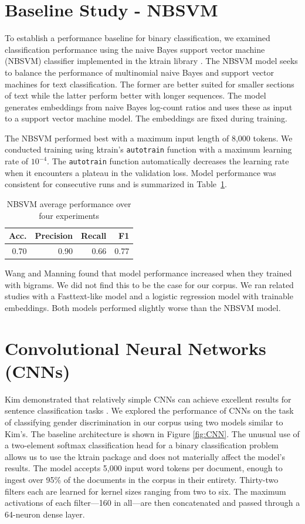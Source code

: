 \documentclass[twocolumn,10pt]{wmrDoc}
\begin{document}
\section{Baseline Study - NBSVM}
To establish a performance baseline for binary classification, we examined classification performance using the naive Bayes support vector machine (NBSVM) classifier implemented in the ktrain library \cite{ktrain}.  The NBSVM model \cite{wang2012} seeks to balance the performance of multinomial naive Bayes and support vector machines for text classification.  The former are better suited for smaller sections of text while the latter perform better with longer sequences.  The model generates embeddings from naive Bayes log-count ratios and uses these as input to a support vector machine model.  The embeddings are fixed during training.

The NBSVM performed best with a maximum input length of 8,000 tokens.  We conducted training using ktrain's \verb|autotrain| function with a maximum learning rate of $10^{-4}$.  The \verb|autotrain| function automatically decreases the learning rate when it encounters a plateau in the validation loss.  Model performance was consistent for consecutive runs and is summarized in Table~\ref{tab:baseline}.

\begin{table}
 \caption{NBSVM average performance over four experiments}
  \centering
  \begin{tabular}{rrrr}
    \toprule
    Acc. & Precision & Recall & F1 \\
    \midrule
    0.70 & 0.90 & 0.66 & 0.77 \\
    \bottomrule
  \end{tabular}
  \label{tab:baseline}
\end{table}

Wang and Manning found that model performance increased when they trained with bigrams.  We did not find this to be the case for our corpus.  We ran related studies with a Fasttext-like model and a logistic regression model with trainable embeddings.  Both models performed slightly worse than the NBSVM model.

\section{Convolutional Neural Networks (CNNs)}
Kim demonstrated that relatively simple CNNs can achieve excellent results for sentence classification tasks \cite{kim}.  We explored the performance of CNNs on the task of classifying gender discrimination in our corpus using two models similar to Kim's.  The baseline architecture is shown in Figure \ref{fig:CNN}.  The unusual use of a two-element softmax classification head for a binary classification problem allows us to use the ktrain package and does not materially affect the model's results.  The model accepts 5,000 input word tokens per document, enough to ingest over 95\% of the documents in the corpus in their entirety.  Thirty-two filters each are learned for kernel sizes ranging from two to six.  The maximum activations of each filter---160 in all---are then concatenated and passed through a 64-neuron dense layer.
\end{document}
